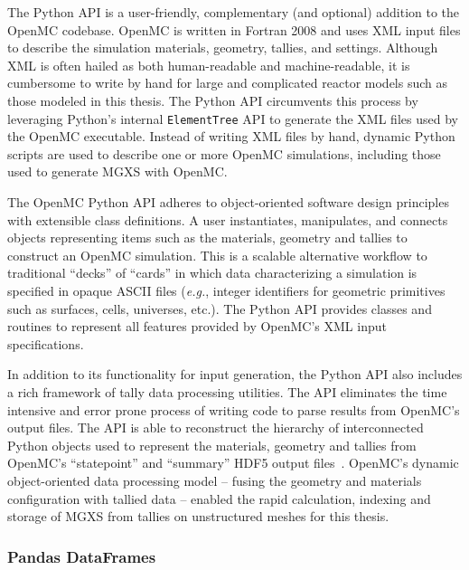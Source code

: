 
The Python \ac{API} is a user-friendly, complementary (and optional) addition to the OpenMC codebase. OpenMC is written in Fortran 2008 and uses \ac{XML} input files to describe the simulation materials, geometry, tallies, and settings. Although \ac{XML} is often hailed as both human-readable and machine-readable, it is cumbersome to write by hand for large and complicated reactor models such as those modeled in this thesis. The Python \ac{API} circumvents this process by leveraging Python's internal \texttt{ElementTree} \ac{API} to generate the \ac{XML} files used by the OpenMC executable. Instead of writing \ac{XML} files by hand, dynamic Python scripts are used to describe one or more OpenMC simulations, including those used to generate \ac{MGXS} with OpenMC.

The OpenMC Python \ac{API} adheres to object-oriented software design principles with extensible class definitions. A user instantiates, manipulates, and connects objects representing items such as the materials, geometry and tallies to construct an OpenMC simulation. This is a scalable alternative workflow to traditional ``decks'' of ``cards'' in which data characterizing a simulation is specified in opaque \ac{ASCII} files (\textit{e.g.}, integer identifiers for geometric primitives such as surfaces, cells, universes, etc.). The Python \ac{API} provides classes and routines to represent all features provided by OpenMC's \ac{XML} input specifications.

In addition to its functionality for input generation, the Python \ac{API} also includes a rich framework of tally data processing utilities. The \ac{API} eliminates the time intensive and error prone process of writing code to parse results from OpenMC's output files. The \ac{API} is able to reconstruct the hierarchy of interconnected Python objects used to represent the materials, geometry and tallies from OpenMC's ``statepoint'' and ``summary'' \ac{HDF5} output files~\cite{koranne2011hdf5}. OpenMC's dynamic object-oriented data processing model -- fusing the geometry and materials configuration with tallied data -- enabled the rapid calculation, indexing and storage of \ac{MGXS} from tallies on unstructured meshes for this thesis.
  
\subsubsection{Pandas DataFrames}
\label{subsubsec:chap4-pandas-df}

